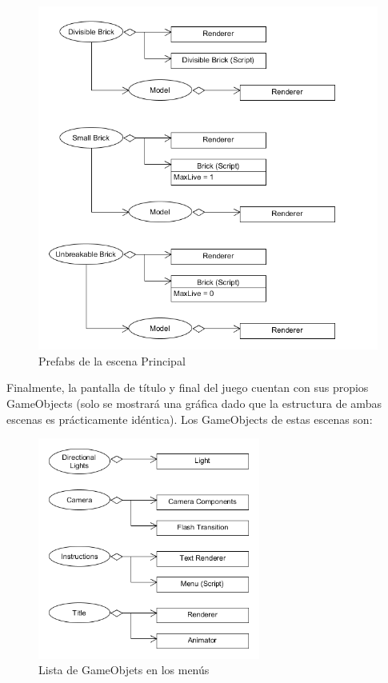 \begin{figure}[h]
	\includegraphics[width=1\textwidth]{images/estructura/clases/room-prefab-3}
	\centering
	\caption{Prefabs de la escena Principal}
\end{figure}

\clearpage 
Finalmente, la pantalla de título y final del juego cuentan con sus propios GameObjects (solo se mostrará una gráfica dado que la estructura de ambas escenas es prácticamente idéntica). Los GameObjects de estas escenas son:
\begin{figure}[h]
	\includegraphics[width=0.65\textwidth]{images/estructura/clases/title-objects}
	\centering
	\caption{Lista de GameObjets en los menús}
\end{figure}

